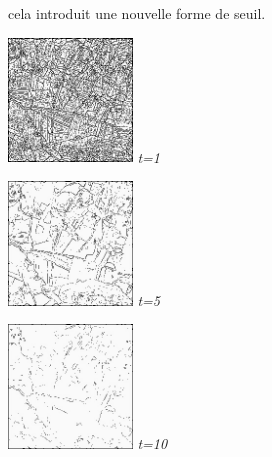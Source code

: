 \documentclass[a4,12pt]{article}
\begin{document}
cela introduit une nouvelle forme de seuil.\\
\noindent
\begin{center}
\begin{minipage}[c]{0.20\linewidth}
	\begin{center}
		\includegraphics[width = 33mm]{./img/p2test_grad_fin_aqitain_t1.jpg}
		\textit{t=1}
	\end{center}
\end{minipage}
\begin{minipage}[c]{0.20\linewidth}
	\begin{center}
		\includegraphics[width = 33mm]{./img/p2test_grad_fin_aqitain_t5.jpg}
		\textit{t=5}
	\end{center}
\end{minipage}
\begin{minipage}[c]{0.20\linewidth}
	\begin{center}
		\includegraphics[width = 33mm]{./img/p2test_grad_fin_aqitain_t10.jpg}
		\textit{t=10}
	\end{center}
\end{minipage}
\end{center}
\end{document}
